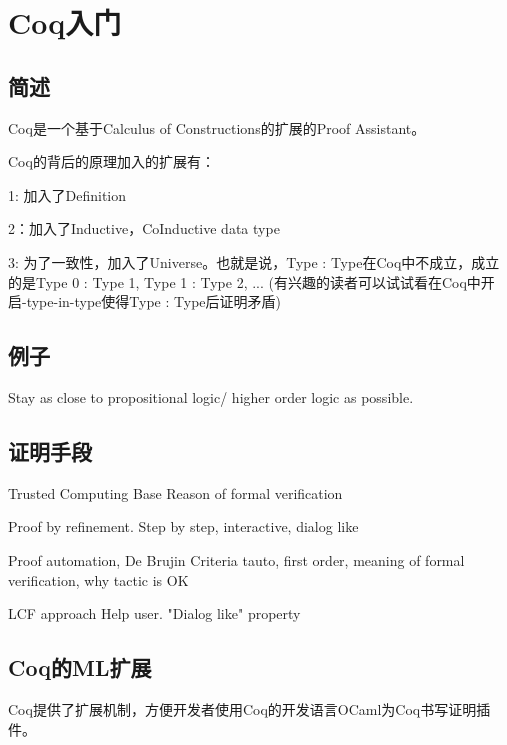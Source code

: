 \section{Coq入门}

\subsection{简述}
Coq是一个基于Calculus of Constructions的扩展的Proof Assistant。

Coq的背后的原理加入的扩展有：

1: 加入了Definition

2：加入了Inductive，CoInductive data type

3: 为了一致性，加入了Universe。也就是说，Type : Type在Coq中不成立，成立的是Type 0 : Type 1, Type 1 : Type 2, ... (有兴趣的读者可以试试看在Coq中开启-type-in-type使得Type : Type后证明矛盾)

\subsection{例子}
Stay as close to propositional logic/ higher order logic as possible.

\subsection{证明手段}
Trusted Computing Base
Reason of formal verification

Proof by refinement.
Step by step, interactive, dialog like

Proof automation, De Brujin Criteria
tauto, first order, meaning of formal verification, why tactic is OK

LCF approach
Help user. "Dialog like" property

\subsection{Coq的ML扩展}
Coq提供了扩展机制，方便开发者使用Coq的开发语言OCaml为Coq书写证明插件。

